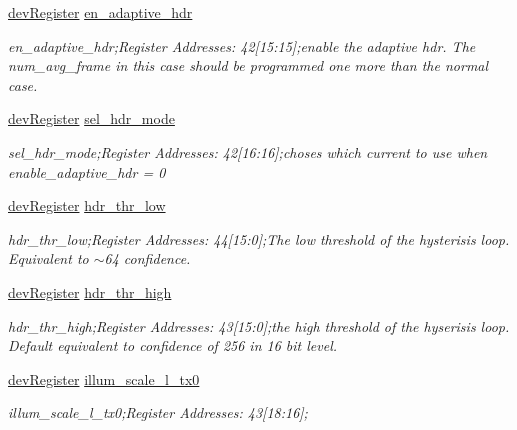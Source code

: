 \begin{DoxyCompactItemize}
\mbox{\hyperlink{classdev_register}{dev\+Register}} \mbox{\hyperlink{class_o_p_t3101_registers_a59efa795cb10c88ad0c35e64f5da5b8c}{en\+\_\+adaptive\+\_\+hdr}}
\begin{DoxyCompactList}\small\item\em en\+\_\+adaptive\+\_\+hdr;Register Addresses\+: 42\mbox{[}15\+:15\mbox{]};enable the adaptive hdr. The num\+\_\+avg\+\_\+frame in this case should be programmed one more than the normal case. \end{DoxyCompactList}\item 
\mbox{\hyperlink{classdev_register}{dev\+Register}} \mbox{\hyperlink{class_o_p_t3101_registers_a85ea733d3ecddf5d3fd92a550aebc602}{sel\+\_\+hdr\+\_\+mode}}
\begin{DoxyCompactList}\small\item\em sel\+\_\+hdr\+\_\+mode;Register Addresses\+: 42\mbox{[}16\+:16\mbox{]};choses which current to use when enable\+\_\+adaptive\+\_\+hdr = \textquotesingle{}0\textquotesingle{} \end{DoxyCompactList}\item 
\mbox{\hyperlink{classdev_register}{dev\+Register}} \mbox{\hyperlink{class_o_p_t3101_registers_acd6df660e813787d9d2ae99df5133166}{hdr\+\_\+thr\+\_\+low}}
\begin{DoxyCompactList}\small\item\em hdr\+\_\+thr\+\_\+low;Register Addresses\+: 44\mbox{[}15\+:0\mbox{]};The low threshold of the hysterisis loop. Equivalent to $\sim$64 confidence. \end{DoxyCompactList}\item 
\mbox{\hyperlink{classdev_register}{dev\+Register}} \mbox{\hyperlink{class_o_p_t3101_registers_ab16a2263e007cef95441aac08fd8e4dd}{hdr\+\_\+thr\+\_\+high}}
\begin{DoxyCompactList}\small\item\em hdr\+\_\+thr\+\_\+high;Register Addresses\+: 43\mbox{[}15\+:0\mbox{]};the high threshold of the hyserisis loop. Default equivalent to confidence of 256 in 16 bit level. \end{DoxyCompactList}\item 
\mbox{\hyperlink{classdev_register}{dev\+Register}} \mbox{\hyperlink{class_o_p_t3101_registers_a859c777ea6199f9d622ff017e34020cc}{illum\+\_\+scale\+\_\+l\+\_\+tx0}}
\begin{DoxyCompactList}\small\item\em illum\+\_\+scale\+\_\+l\+\_\+tx0;Register Addresses\+: 43\mbox{[}18\+:16\mbox{]}; \end{DoxyCompactList}\item 

\end{DoxyCompactItemize}

